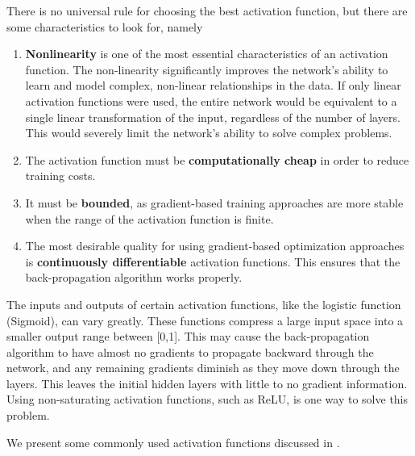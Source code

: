 \documentclass{article}
\begin{document}
\noindent There is no universal rule for choosing the best activation function, but there are some characteristics to look for, namely
\begin{enumerate}
  \item \textbf{Nonlinearity} is one of the most essential characteristics
of an activation function. The non-linearity significantly improves the network's ability to learn and model complex, non-linear relationships in the data. If only linear activation functions were used, the entire network would be equivalent to a single linear transformation of the input, regardless of the number of layers. This would severely limit the network's ability to solve complex problems.

  \item The activation function must
  be \textbf{computationally cheap} in order to reduce training costs.
  \item It must be \textbf{bounded}, as gradient-based training approaches are more stable when the range of the activation function is finite. 
\item The most desirable quality for using
gradient-based optimization approaches is \textbf{continuously
  differentiable} activation functions. This ensures that the
back-propagation algorithm works properly. 
\end{enumerate}
\begin{remark} The inputs and outputs of certain activation functions, like the logistic function (Sigmoid), can vary greatly. These functions compress a large input space into a smaller output range between [0,1]. This may cause the back-propagation algorithm to have almost no gradients to propagate backward through the network, and any remaining gradients diminish as they move down through the layers. This leaves the initial hidden layers with little to no gradient information. Using non-saturating activation functions, such as ReLU, is one way to solve this problem. 
\end{remark}
We present some commonly used activation functions discussed in \cite{jagtap2022important}.
\end{document}
